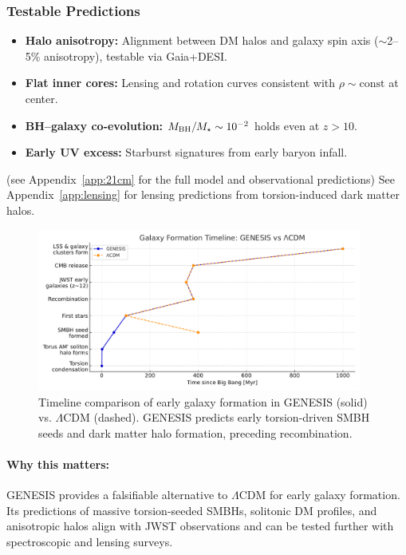 \documentclass{article}
\begin{document}
\subsubsection{Testable Predictions}
\begin{itemize}
  \item \textbf{Halo anisotropy:} Alignment between DM halos and galaxy spin axis ($\sim$2--5\% anisotropy), testable via Gaia+DESI.
  \item \textbf{Flat inner cores:} Lensing and rotation curves consistent with $\rho \sim \text{const}$ at center.
  \item \textbf{BH--galaxy co-evolution:} $M_{\rm BH}/M_\star \sim 10^{-2}$ holds even at $z>10$.
  \item \textbf{Early UV excess:} Starburst signatures from early baryon infall.
\end{itemize}

(see Appendix~\ref{app:21cm} for the full model and observational predictions)
See Appendix~\ref{app:lensing} for lensing predictions from torsion-induced dark matter halos.

\begin{figure}[h!]
\centering
\includegraphics[width=0.95\textwidth]{Timeline_GENESIS_vs_LCDM.pdf}
\caption{Timeline comparison of early galaxy formation in GENESIS (solid) vs. $\Lambda$CDM (dashed). GENESIS predicts early torsion-driven SMBH seeds and dark matter halo formation, preceding recombination.}
\label{fig:galaxy_timeline}
\end{figure}


\begin{tcolorbox}[colback=gray!5, colframe=black!30, title=Why this matters]

\paragraph{Why this matters:}
GENESIS provides a falsifiable alternative to $\Lambda$CDM for early galaxy formation. Its predictions of massive torsion-seeded SMBHs, solitonic DM profiles, and anisotropic halos align with JWST observations and can be tested further with spectroscopic and lensing surveys.

\end{tcolorbox}
\end{document}
